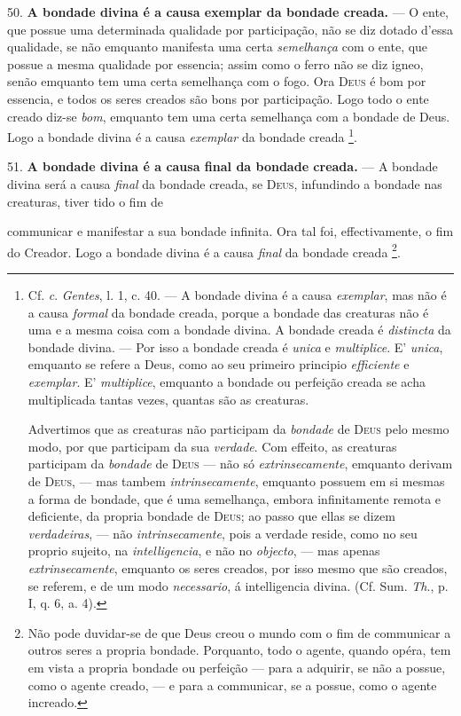 50. \textbf{A bondade divina é a causa exemplar da bondade creada.} --- O ente, que possue uma determinada qualidade por participação, não se diz dotado d'essa qualidade, se não emquanto manifesta uma certa \emph{semelhança} com o ente, que possue a mesma qualidade por essencia; assim como o ferro não se diz igneo, senão emquanto tem uma certa semelhança com o fogo. Ora \textsc{Deus} é bom por essencia, e todos os seres creados são bons por participação. Logo todo o ente creado diz-se \emph{bom}, emquanto tem uma certa semelhança com a bondade de Deus. Logo a bondade divina é a causa \emph{exemplar} da bondade creada \footnote{Cf. \emph{c}. \emph{Gentes}, l. 1, c. 40. --- A bondade divina é a causa \emph{exemplar}, mas não é a causa \emph{formal} da bondade creada, porque a bondade das creaturas não é uma e a mesma coisa com a bondade divina. A bondade creada é \emph{distincta} da bondade divina. --- Por isso a bondade creada é \emph{unica} e \emph{multiplice}. E' \emph{unica}, emquanto se refere a Deus, como ao seu primeiro principio \emph{efficiente} e \emph{exemplar}. E' \emph{multiplice}, emquanto a bondade ou perfeição creada se acha multiplicada tantas vezes, quantas são as creaturas.\par Advertimos que as creaturas não participam da \emph{bondade} de \textsc{Deus} pelo mesmo modo, por que participam da sua \emph{verdade}. Com effeito, as creaturas participam da \emph{bondade} de \textsc{Deus} --- não só \emph{extrinsecamente}, emquanto derivam de \textsc{Deus}, --- mas tambem \emph{intrinsecamente}, emquanto possuem em si mesmas a forma de bondade, que é uma semelhança, embora infinitamente remota e deficiente, da propria bondade de \textsc{Deus}; ao passo que ellas se dizem \emph{verdadeiras}, --- não \emph{intrinsecamente}, pois a verdade reside, como no seu proprio sujeito, na \emph{intelligencia}, e não no \emph{objecto}, --- mas apenas \emph{extrinsecamente}, emquanto os seres creados, por isso mesmo que são creados, se referem, e de um modo \emph{necessario}, á intelligencia divina. (Cf. Sum. \emph{Th}., p. I, q. 6, a. 4).}.

51. \textbf{A bondade divina é a causa final da bondade creada.} --- A bondade divina será a causa \emph{final} da bondade creada, se \textsc{Deus}, infundindo a bondade nas creaturas, tiver tido o fim de

 communicar e manifestar a sua bondade infinita. Ora tal foi, effectivamente, o fim do Creador. Logo a bondade divina é a causa \emph{final} da bondade creada \footnote{Não pode duvidar-se de que Deus creou o mundo com o fim de communicar a outros seres a propria bondade. Porquanto, todo o agente, quando opéra, tem em vista a propria bondade ou perfeição --- para a adquirir, se não a possue, como o agente creado, --- e para a communicar, se a possue, como o agente increado.}.


